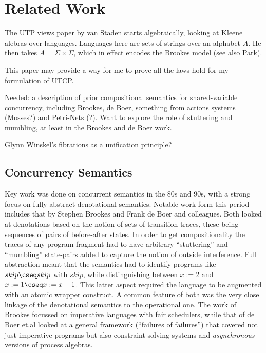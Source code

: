 \section{Related Work}\label{sec:related}

The UTP views paper by van Staden\cite{DBLP:conf/utp/Staden14}
starts algebraically, looking at Kleene alebras over languages.
Languages here are sets of strings over an alphabet $A$.
He then takes $A =\Sigma\times\Sigma$,
which in effect encodes the Brookes model\cite{DBLP:journals/iandc/Brookes96}
(see also Park\cite{conf/ac/Park79}).

This paper may provide a way for me to prove all the laws hold for
my formulation of UTCP.


Needed: a description of prior compositional semantics
for shared-variable concurrency,
including Brookes, de Boer, something from actions systems (Mosses?)
and Petri-Nets (?).
Want to explore the role of stuttering and mumbling,
at least in the Brookes and de Boer work.

Glynn Winskel's fibrations as a unification principle?


\subsection{Concurrency Semantics}

Key work was done on concurrent semantics in the 80s and 90s,
with a strong focus on fully abstract denotational
semantics.
Notable work form this period includes that by
Stephen Brookes\cite{DBLP:journals/iandc/Brookes96}
and Frank de Boer and colleagues\cite{DBLP:conf/concur/BoerKPR91}.
Both looked at denotations based on the notion of sets of transition traces,
these being sequences of pairs of before-after states.
In order to get compositionality the traces of any program fragment
had to have arbitrary ``stuttering'' and ``mumbling'' state-pairs
added to capture the notion of outside interference.
Full abstraction meant that the semantics had to identify
programs like $skip\cseq skip$ with $skip$,
while distinguishing between $x:=2$ and $x:=1\cseq x:=x+1$.
This latter aspect required the language to be augmented with
an atomic wrapper construct.
A common feature of both was the very close linkage of the denotational
semantics to the operational one.
The work of Brookes\cite{DBLP:journals/iandc/Brookes96}
focussed on imperative languages with fair schedulers,
while that of de Boer et.al\cite{DBLP:conf/concur/BoerKPR91}
looked at a general framework (``failures of failures'')
that covered not just imperative programs
but also constraint solving systems
and \emph{asynchronous} versions of process algebras.


